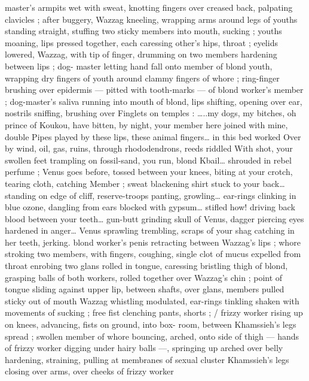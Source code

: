 {master's armpits wet with sweat, knotting fingers over creased back, 
palpating clavicles ; after buggery, Wazzag kneeling, wrapping arms 
around legs of youths standing straight, stuffing two sticky members 
into mouth, sucking ; youths moaning, lips pressed together, each 
caressing other's hips, throat ; eyelids lowered, Wazzag, with tip of 
finger, drumming on two members hardening between lips ; dog- 
master letting hand fall onto member of blond youth, wrapping dry 
fingers of youth around clammy fingers of whore ; ring-finger 
brushing over epidermis --- pitted with tooth-marks --- of blond 
worker's member ; dog-master's saliva running into mouth of blond, 
lips shifting, opening over ear, nostrils sniffing, brushing over 
Finglets on temples : {\gl}{\ldots}..my dogs, my bitches, oh prince of Koukou, 
have bitten, by night, your member here joined with mine, double 
Pipes played by these lips, these animal fingers{\ldots} in this bed worked 
Over by wind, oil, gas, ruins, through rhododendrons, reeds riddled 
With shot, your swollen feet trampling on fossil-sand, you run, blond 
Kbail{\ldots} shrouded in rebel perfume ; Venus goes before, tossed 
between your knees, biting at your crotch, tearing cloth, catching 
Member ; sweat blackening shirt stuck to your back{\ldots} standing on 
edge of cliff, reserve-troops panting, growling{\ldots} ear-rings clinking in 
blue ozone, dangling from ears blocked with gypsum{\ldots} stifled how! 
driving back blood between your teeth{\ldots} gun-butt grinding skull of 
Venus, dagger piercing eyes hardened in anger{\ldots} Venus sprawling 
trembling, scraps of your shag catching in her teeth, jerking.{\gr} 
blond worker's penis retracting between Wazzag's lips ; whore 
stroking two members, with fingers, coughing, single clot of mucus 
expelled from throat enrobing two glans rolled in tongue, caressing 
bristling thigh of blond, grasping balls of both workers, rolled 
together over Wazzag's chin ; point of tongue sliding against upper 
lip, between shafts, over glans, members pulled sticky out of mouth 
Wazzag whistling modulated, ear-rings tinkling shaken with 
movements of sucking ; free fist clenching pants, shorts ; {\slash} frizzy 
worker rising up on knees, advancing, fists on ground, into box- 
room, between Khamssieh's legs spread ; swollen member of whore 
bouncing, arched, onto side of thigh --- hands of frizzy worker 
digging under hairy balls ---, springing up arched over belly 
hardening, straining, pulling at membranes of sexual cluster 
Khamssieh's legs closing over arms, over cheeks of frizzy worker 
}
